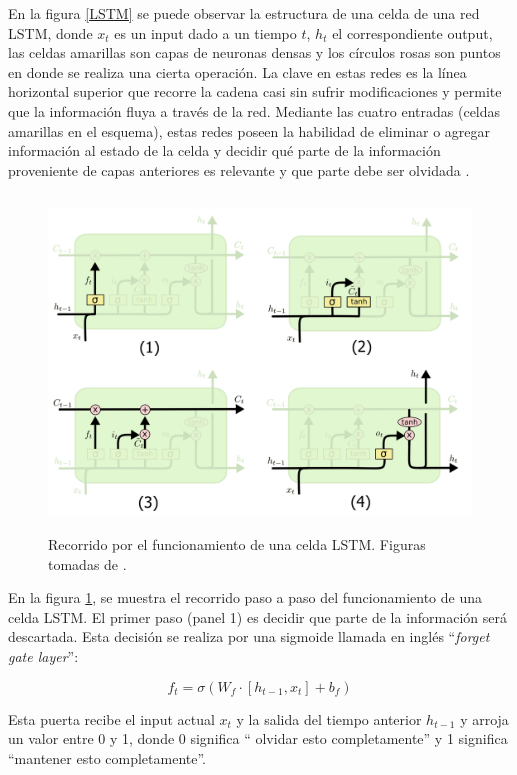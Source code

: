 En la figura \ref{LSTM} se puede observar la estructura de una celda de una red LSTM, donde $x_t$ es un input 
dado a un tiempo $t$, $h_t$ el correspondiente output, las celdas amarillas son 
capas de neuronas densas y los círculos rosas son puntos en donde se realiza una cierta operación. La clave en estas
redes es la línea horizontal superior que recorre la cadena casi sin sufrir modificaciones y permite que la información
fluya a través de la red. Mediante las cuatro entradas (celdas amarillas en el esquema),
estas redes poseen la habilidad de eliminar o agregar información al estado de la celda y decidir qué parte de la información
proveniente de capas anteriores es relevante y que parte debe ser olvidada \cite{olah}. 

\begin{figure}[h!]
  \begin{center}
    \includegraphics[height=3.5in]{Figures/LSTMs.png}
    \caption{ Recorrido por el funcionamiento de una celda LSTM. Figuras tomadas de \cite{olah}. }
    \label{LSTMrec}
  \end{center}
\end{figure}

En la figura \ref{LSTMrec}, se muestra el recorrido paso a paso del funcionamiento de una celda LSTM. 
El primer paso (panel 1) es decidir 
que parte de la información será descartada. Esta decisión se realiza por una sigmoide llamada en inglés ``\textit{forget gate layer}'':

\begin{equation}
  f_t = \sigma(W_f\cdot[h_{t-1},x_t]+b_f)
\end{equation}

Esta puerta recibe el input actual $x_t$ y la salida del tiempo anterior $h_{t-1}$ y arroja un valor entre 0 y 1, donde 0 significa
 `` olvidar esto completamente''  y 1 significa ``mantener esto completamente''. 

